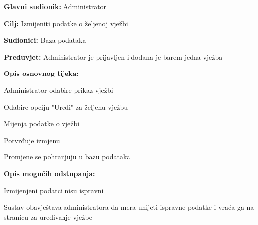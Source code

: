 					\noindent {}
					\begin{packed_item}
						
						\item \textbf{Glavni sudionik:} Administrator
						\item  \textbf{Cilj:} Izmijeniti podatke o željenoj vježbi
						\item  \textbf{Sudionici:} Baza podataka
						\item  \textbf{Preduvjet:} Administrator je prijavljen i dodana je barem jedna vježba
						\item  \textbf{Opis osnovnog tijeka:}
						
						\item[] \begin{packed_enum}
							
							\item Administrator odabire prikaz vježbi
							\item Odabire opciju "Uredi" za željenu vježbu
							\item Mijenja podatke o vježbi
							\item Potvrđuje izmjenu
							\item Promjene se pohranjuju u bazu podataka
							
						\end{packed_enum}
						
						\item  \textbf{Opis mogućih odstupanja:}
						
						\item[] \begin{packed_item}
							
							\item[3.a] Izmijenjeni podatci nisu ispravni 
							\item[] \begin{packed_enum}
								
								\item Sustav obavještava administratora da mora unijeti ispravne podatke i vraća ga na stranicu za uređivanje vježbe
							\end{packed_enum}
							
						\end{packed_item}	
						
					\end{packed_item}
					
